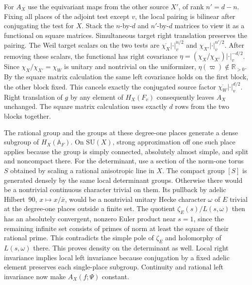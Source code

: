 For \(A_X\) use the equivariant maps from the other source \(X'\),
of rank \(n'=d-n\). Fixing all places of the adjoint test except
\(v\), the local pairing is bilinear after conjugating the test
for \(X\). Stack the \(n\)-by-\(d\) and \(n'\)-by-\(d\) matrices
to view it as a functional on square matrices. Simultaneous target
right translation preserves the pairing. The Weil target scalars
on the two tests are \(\overline{\chi_X}|\cdot|_v^{n/2}\) and
\(\chi_{X'}|\cdot|_v^{n'/2}\). After removing these scalars, the
functional has right covariance
\(\eta=(\chi_X/\chi_{X'})|\cdot|_v^{-d/2}\).
Since \(\chi_X/\chi_{X'}=\chi_W\) is unitary and nontrivial on the
uniformizer, \(\eta(\varpi)\notin\mathbb R_{>0}\). By the square
matrix calculation the same left covariance holds on the first
block, the other block fixed. This cancels exactly the conjugated
source factor \(\overline{\chi_W}|\cdot|_v^{d/2}\). Right
translation of \(g\) by any element of \(H_X(F_v)\) consequently
leaves \(A_X\) unchanged. The square matrix calculation uses
exactly \(d\) rows from the two blocks together.

The rational group and the groups at these degree-one places
generate a dense subgroup of \(H_X(\mathbb A_F)\). On
\(\mathrm{SU}(X)\), strong approximation off one such place applies
because the group is simply connected, absolutely almost simple,
and split and noncompact there. For the determinant, use a section
of the norm-one torus \(S\) obtained by scaling a rational
anisotropic line in \(X\). The compact group \([S]\) is generated
densely by the same local determinant groups. Otherwise there
would be a nontrivial continuous character trivial on them. Its
pullback by adelic Hilbert~90, \(x\mapsto x/\bar x\), would be a
nontrivial unitary Hecke character \(\omega\) of \(E\) trivial at
the degree-one places outside a finite set. The quotient
\(\zeta_E(s)/L(s,\omega)\) then has an absolutely convergent,
nonzero Euler product near \(s=1\), since the remaining infinite
set consists of primes of norm at least the square of their
rational prime. This contradicts the simple pole of \(\zeta_E\)
and holomorphy of \(L(s,\omega)\) there. This proves
density on the determinant as well. Local right invariance implies
local left invariance because conjugation by a fixed adelic element
preserves each single-place subgroup. Continuity and rational left
invariance now make \(A_X(f;\Psi)\) constant.
\cite[Theorem~7.12]{p2platonov-strong-approximation}
\cite[\S4]{tate-thesis}

